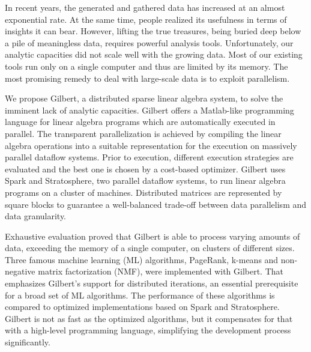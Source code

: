 \clearemptydoublepage
{}
{}

\vspace*{2cm}
\begin{center}
\end{center}
\vspace{1cm}

In recent years, the generated and gathered data has increased at an almost exponential rate.
At the same time, people realized its usefulness in terms of insights it can bear.
However, lifting the true treasures, being buried deep below a pile of meaningless data, requires powerful analysis tools.
Unfortunately, our analytic capacities did not scale well with the growing data.
Most of our existing tools run only on a single computer and thus are limited by its memory.
The most promising remedy to deal with large-scale data is to exploit parallelism.

We propose Gilbert, a distributed sparse linear algebra system, to solve the imminent lack of analytic capacities.
Gilbert offers a Matlab-like programming language for linear algebra programs which are automatically executed in parallel.
The transparent parallelization is achieved by compiling the linear algebra operations into a suitable representation for the execution on massively parallel dataflow systems.
Prior to execution, different execution strategies are evaluated and the best one is chosen by a cost-based optimizer.
Gilbert uses Spark and Stratosphere, two parallel dataflow systems, to run linear algebra programs on a cluster of machines.
Distributed matrices are represented by square blocks to guarantee a well-balanced trade-off between data parallelism and data granularity.

Exhaustive evaluation proved that Gilbert is able to process varying amounts of data, exceeding the memory of a single computer, on clusters of different sizes.
Three famous machine learning (ML) algorithms, PageRank, k-means and non-negative matrix factorization (NMF), were implemented with Gilbert.
That emphasizes Gilbert's support for distributed iterations, an essential prerequisite for a broad set of ML algorithms.
The performance of these algorithms is compared to optimized implementations based on Spark and Stratosphere.
Gilbert is not as fast as the optimized algorithms, but it compensates for that with a high-level programming language, simplifying the development process significantly.